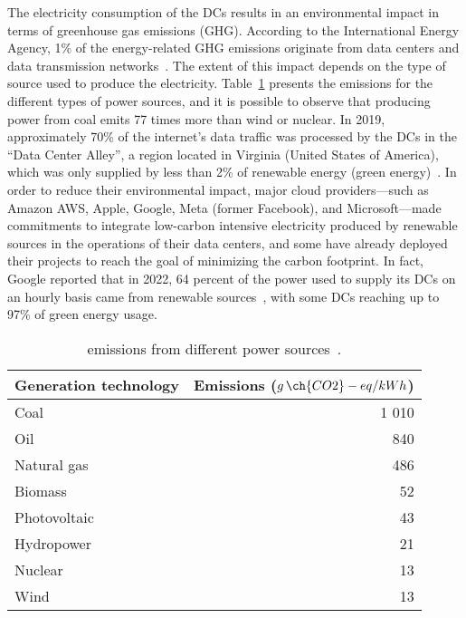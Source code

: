 The electricity consumption of the DCs results in an environmental impact in terms of greenhouse gas emissions (GHG). According to the International Energy Agency, 1\% of the energy-related GHG emissions originate from data centers and data transmission networks~\cite{IEA_2022}. The extent of this impact depends on the type of source used to produce the electricity. Table~\ref{tab:co2_power_sources} presents the emissions for the different types of power sources, and it is possible to observe that producing power from coal emits 77 times more  than wind or nuclear. In 2019, approximately 70\% of the internet's data traffic was processed by the DCs in the ``Data Center Alley'', a region located in Virginia (United States of America), which was only supplied by less than 2\% of renewable energy (green energy)~\cite{clicking_clean_virginia}. In order to reduce their environmental impact, major cloud providers---such as Amazon AWS, Apple, Google, Meta (former Facebook), and Microsoft---made commitments to integrate low-carbon intensive electricity produced by renewable sources in the operations of their data centers, and some have already deployed their projects to reach the goal of minimizing the carbon footprint. In fact, Google reported that in 2022, 64 percent of the power used to supply its DCs on an hourly basis came from renewable sources~\cite{google_sustainability_report_2023}, with some DCs reaching up to 97\% of green energy usage.\begin{table}[!ht]

\caption{  emissions from different power sources~\cite{nrel_lifecycle_2021}.}\label{tab:co2_power_sources} \centering

\begin{tabular}{|l|r|}
  \hline
  \textbf{Generation technology} & \textbf{Emissions ($g\,\ch{CO2}-eq/kWh$)}   \\
  \hline  
  Coal   & 1 010\\  
  \hline
  Oil   & 840\\
  \hline
  Natural gas   & 486\\
   \hline
  Biomass   & 52 \\
  \hline
  Photovoltaic   & 43 \\
  \hline
  Hydropower & 21 \\
  \hline
  Nuclear   & 13 \\
  \hline
  Wind   & 13 \\
  \hline
\end{tabular}
\end{table}


